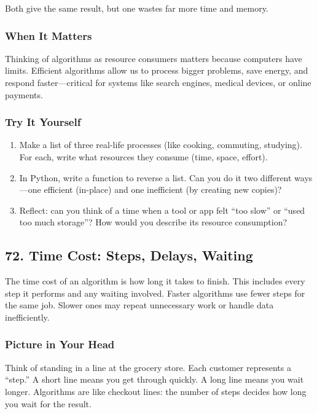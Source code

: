 \documentclass[
  letterpaper,
  DIV=11,
  numbers=noendperiod]{scrreprt}
\providecommand{\tightlist}{%
  \setlength{\itemsep}{0pt}\setlength{\parskip}{0pt}}
\begin{document}
Both give the same result, but one wastes far more time and memory.

\subsubsection{When It Matters}\label{when-it-matters-69}

Thinking of algorithms as resource consumers matters because computers
have limits. Efficient algorithms allow us to process bigger problems,
save energy, and respond faster---critical for systems like search
engines, medical devices, or online payments.

\subsubsection{Try It Yourself}\label{try-it-yourself-71}

\begin{enumerate}
\def\labelenumi{\arabic{enumi}.}
\tightlist
\item
  Make a list of three real-life processes (like cooking, commuting,
  studying). For each, write what resources they consume (time, space,
  effort).
\item
  In Python, write a function to reverse a list. Can you do it two
  different ways---one efficient (in-place) and one inefficient (by
  creating new copies)?
\item
  Reflect: can you think of a time when a tool or app felt ``too slow''
  or ``used too much storage''? How would you describe its resource
  consumption?
\end{enumerate}

\subsection{72. Time Cost: Steps, Delays,
Waiting}\label{time-cost-steps-delays-waiting}

The time cost of an algorithm is how long it takes to finish. This
includes every step it performs and any waiting involved. Faster
algorithms use fewer steps for the same job. Slower ones may repeat
unnecessary work or handle data inefficiently.

\subsubsection{Picture in Your Head}\label{picture-in-your-head-72}

Think of standing in a line at the grocery store. Each customer
represents a ``step.'' A short line means you get through quickly. A
long line means you wait longer. Algorithms are like checkout lines: the
number of steps decides how long you wait for the result.
\end{document}
